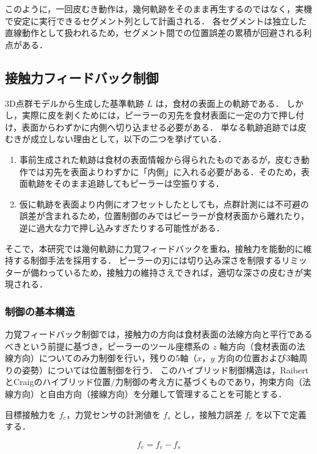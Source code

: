 このように，一回皮むき動作は，幾何軌跡をそのまま再生するのではなく，実機で安定に実行できるセグメント列として計画される．
各セグメントは独立した直線動作として扱われるため，セグメント間での位置誤差の累積が回避される利点がある．

\subsection{接触力フィードバック制御}
\label{sec:peeling_force_feedback}

3D点群モデルから生成した基準軌跡 $L$ は，食材の表面上の軌跡である．
しかし，実際に皮を剥くためには，ピーラーの刃先を食材表面に一定の力で押し付け，表面からわずかに内側へ切り込ませる必要がある．
単なる軌跡追跡では皮むきが成立しない理由として，以下の二つを挙げている．

\begin{enumerate}
  \item 事前生成された軌跡は食材の表面情報から得られたものであるが，皮むき動作では刃先を表面よりわずかに「内側」に入れる必要がある．そのため，表面軌跡をそのまま追跡してもピーラーは空振りする．
  \item 仮に軌跡を表面より内側にオフセットしたとしても，点群計測には不可避の誤差が含まれるため，位置制御のみではピーラーが食材表面から離れたり，逆に過大な力で押し込みすぎたりする可能性がある．
\end{enumerate}

そこで，本研究では幾何軌跡に力覚フィードバックを重ね，接触力を能動的に維持する制御手法を採用する．
ピーラーの刃には切り込み深さを制限するリミッターが備わっているため，接触力の維持さえできれば，適切な深さの皮むきが実現される．

\subsubsection{制御の基本構造}

力覚フィードバック制御では，接触力の方向は食材表面の法線方向と平行であるべきという前提に基づき，ピーラーのツール座標系の $z$ 軸方向（食材表面の法線方向）についてのみ力制御を行い，残りの5軸（$x$，$y$ 方向の位置および3軸周りの姿勢）については位置制御を行う．
このハイブリッド制御構造は，RaibertとCraig\cite{RaibertCraig1981Hybrid}のハイブリッド位置/力制御の考え方に基づくものであり，拘束方向（法線方向）と自由方向（接線方向）を分離して管理することを可能とする．

目標接触力を $f_c$，力覚センサの計測値を $f_s$ とし，接触力誤差 $f_e$ を以下で定義する．

\begin{equation}
  f_e = f_c - f_s
  \label{eq:peeling_force_error}
\end{equation}

